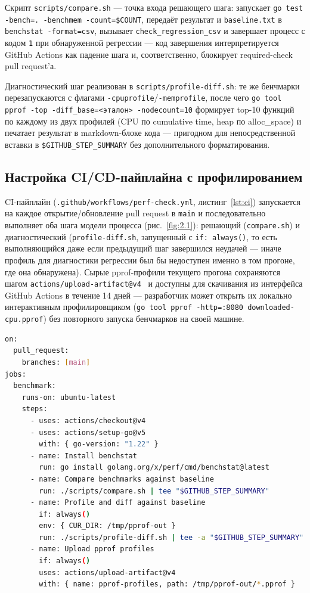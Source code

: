 Скрипт \texttt{scripts/\allowbreak compare.sh} — точка входа решающего шага: запускает
\texttt{go test -bench=. -benchmem -count=\$COUNT}, передаёт результат и
\texttt{baseline.txt} в \texttt{benchstat -format=csv}, вызывает
\texttt{check\_regression\_csv} и завершает процесс с кодом \texttt{1} при
обнаруженной регрессии — код завершения интерпретируется GitHub Actions как
падение шага и, соответственно, блокирует required-check pull request'а.

Диагностический шаг реализован в \texttt{scripts/\allowbreak profile-diff.sh}: те же
бенчмарки перезапускаются с флагами \texttt{-cpuprofile}/\texttt{-memprofile},
после чего \texttt{go tool pprof -top -diff\_base=<эталон> -nodecount=10}
формирует top-10 функций по каждому из двух профилей (CPU по cumulative
time, heap по alloc\_space) и печатает результат в markdown-блоке кода —
пригодном для непосредственной вставки в \texttt{\$GITHUB\_STEP\_SUMMARY}
без дополнительного форматирования.

\subsection{Настройка CI/CD-пайплайна с профилированием}
\label{sec:4.2}

CI-пайплайн (\texttt{.github/\allowbreak workflows/\allowbreak perf-check.yml}, листинг~\ref{lst:ci})
запускается на каждое открытие/обновление pull request в \texttt{main} и
последовательно выполняет оба шага модели процесса (рис.~\ref{fig:2.1}):
решающий (\texttt{compare.sh}) и диагностический (\texttt{profile-diff.sh},
запущенный с \texttt{if: always()}, то есть выполняющийся даже если
предыдущий шаг завершился неудачей — иначе профиль для диагностики
регрессии был бы недоступен именно в том прогоне, где она обнаружена).
Сырые pprof-профили текущего прогона сохраняются шагом
\texttt{actions/\allowbreak upload-artifact@v4}~\cite{gh-upload-artifact} и доступны для скачивания из интерфейса
GitHub Actions в течение 14 дней — разработчик может открыть их локально
интерактивным профилировщиком (\texttt{go tool pprof -http=:8080
downloaded-cpu.pprof}) без повторного запуска бенчмарков на своей машине.

\begin{lstlisting}[language=bash,caption={CI-пайплайн --- .github/workflows/perf-check.yml (ключевые шаги)},label={lst:ci}]
on:
  pull_request:
    branches: [main]
jobs:
  benchmark:
    runs-on: ubuntu-latest
    steps:
      - uses: actions/checkout@v4
      - uses: actions/setup-go@v5
        with: { go-version: "1.22" }
      - name: Install benchstat
        run: go install golang.org/x/perf/cmd/benchstat@latest
      - name: Compare benchmarks against baseline
        run: ./scripts/compare.sh | tee "$GITHUB_STEP_SUMMARY"
      - name: Profile and diff against baseline
        if: always()
        env: { CUR_DIR: /tmp/pprof-out }
        run: ./scripts/profile-diff.sh | tee -a "$GITHUB_STEP_SUMMARY"
      - name: Upload pprof profiles
        if: always()
        uses: actions/upload-artifact@v4
        with: { name: pprof-profiles, path: /tmp/pprof-out/*.pprof }
\end{lstlisting}

